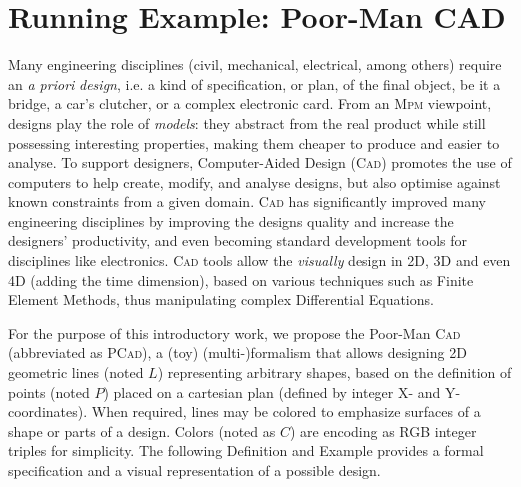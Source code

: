 \section{Running Example: Poor-Man CAD}
\label{sec:Examples}

Many engineering disciplines (civil, mechanical, electrical, among others) 
require an \emph{a priori} \emph{design}, i.e. a kind of specification, or plan, 
of the final object, be it a bridge, a car's clutcher, or a complex electronic 
card. From an \textsc{Mpm} viewpoint, designs play the role of \emph{models}: 
they abstract from the real product while still possessing interesting 
properties, making them cheaper to produce and easier to analyse. To support 
designers, Computer-Aided Design (\textsc{Cad}) promotes the use of computers to 
help create, modify, and analyse designs, but also optimise against known 
constraints from a given domain. \textsc{Cad} has significantly improved many 
engineering disciplines by improving the designs quality and increase the 
designers' productivity, and even becoming standard development tools for 
disciplines like electronics. \textsc{Cad} tools allow the \emph{visually} 
design in 2D, 3D and even 4D (adding the time dimension), based on various 
techniques such as Finite Element Methods, thus manipulating complex 
Differential Equations. 

For the purpose of this introductory work, we propose the Poor-Man \textsc{Cad} 
(abbreviated as \textsc{PCad}), a (toy) (multi-)formalism that allows designing 
2D geometric lines (noted $L$) representing arbitrary shapes, based on the 
definition of points (noted $P$) placed on a cartesian plan (defined by integer 
X- and Y-coordinates). When required, lines may be colored to emphasize 
surfaces of a shape or parts of a design. Colors (noted as $C$) are encoding as 
RGB integer triples for simplicity. The following Definition and Example 
provides a formal specification and a visual representation of a possible 
design.

